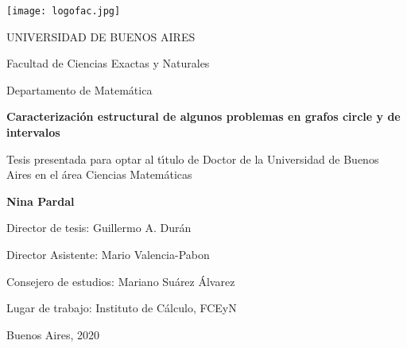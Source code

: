 \documentclass[12pt]{book}
\theoremstyle{plain}
\theoremstyle{remark}
\begin{document}
\newpage

\thispagestyle{empty}

\begin {center}

\texttt{[image: logofac.jpg]}

\medskip
UNIVERSIDAD DE BUENOS AIRES

Facultad de Ciencias Exactas y Naturales

Departamento de Matem\'atica


\vspace{3cm}


\textbf{\large Caracterización estructural de algunos problemas en grafos circle y de intervalos}


\vspace{2cm}


Tesis presentada para optar al t\'\i tulo de Doctor de la Universidad de Buenos Aires en el \'area Ciencias Matem\'aticas %

\vspace{2cm}

\textbf{Nina Pardal}

\end {center}


\vspace{1.5cm}

\noindent Director de tesis: Guillermo A. Dur\'an 

\noindent Director Asistente: Mario Valencia-Pabon 

\noindent Consejero de estudios: Mariano Su\'arez \'Alvarez

\vspace{1cm}

\noindent Lugar de trabajo: Instituto de C\'alculo, FCEyN %


\vspace{1cm}

\noindent Buenos Aires, 2020 %


\newpage

	
\end{document}
